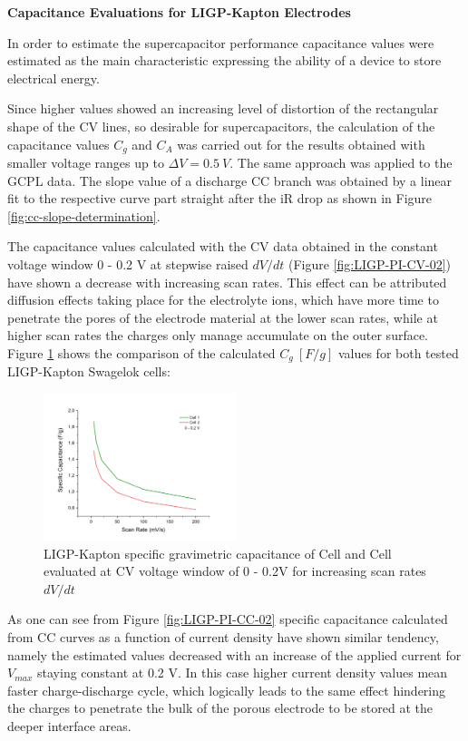 \textbf{Capacitance Evaluations for LIGP-Kapton Electrodes}

In order to estimate the supercapacitor performance capacitance values were estimated as the main characteristic expressing the ability of a device to store electrical energy. 

Since higher values showed an increasing level of distortion of the rectangular shape of the CV lines, so desirable for supercapacitors, the calculation of the capacitance values $C_g$ and $C_A$ was carried out for the results obtained with smaller voltage ranges up to $\Delta V = 0.5\:V$. The same approach was applied to the GCPL data. The slope value of a discharge CC branch was obtained by a linear fit to the respective curve part straight after the iR drop as shown in Figure \ref{fig:cc-slope-determination}.

The capacitance values calculated with the CV data obtained in the constant voltage window 0 - 0.2 V at stepwise raised $dV/dt$ (Figure \ref{fig:LIGP-PI-CV-02}) have shown a decrease with increasing scan rates. This effect can be attributed diffusion effects taking place for the electrolyte ions, which have more time to penetrate the pores of the electrode material at the lower scan rates, while at higher scan rates the charges only manage accumulate on the outer surface. Figure \ref{fig:LIGP-PI-CV-Capacitance-02} shows the comparison of the calculated $C_g\:[F/g]$ values for both tested LIGP-Kapton Swagelok cells: 

\begin{figure}[H]
\centering
\includegraphics[width=0.5\textwidth]{Figures/Results/Electrochemistry/Comparisons/LIGP-PI-Cells-Comparison-from-CV.jpg}
\medskip
\captionsetup{width=0.7\linewidth}
\caption{LIGP-Kapton specific gravimetric capacitance of Cell and Cell evaluated at CV voltage window of 0 - 0.2\:V for increasing scan rates $dV/dt$}
\label{fig:LIGP-PI-CV-Capacitance-02}
\end{figure}

As one can see from Figure \ref{fig:LIGP-PI-CC-02} specific capacitance calculated from CC curves as a function of current density have shown similar tendency, namely the estimated values decreased with an increase of the applied current for $V_{max}$ staying constant at 0.2 V. In this case higher current density values mean faster charge-discharge cycle, which logically leads to the same effect hindering the charges to penetrate the bulk of the porous electrode to be stored at the deeper interface areas. 

